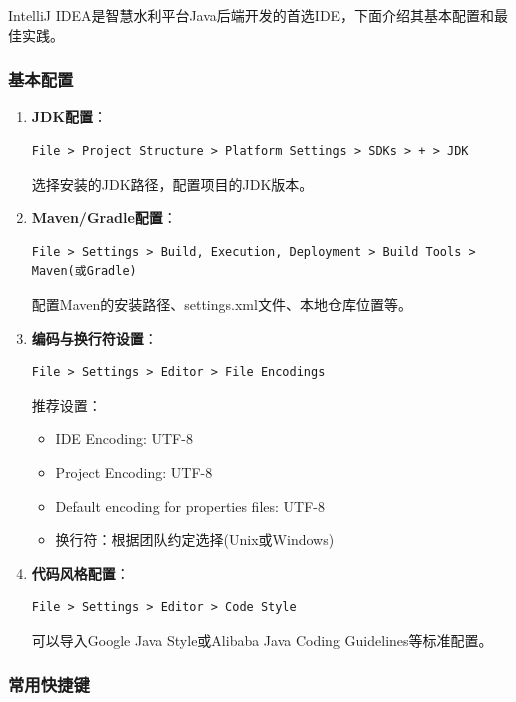 IntelliJ
IDEA是智慧水利平台Java后端开发的首选IDE，下面介绍其基本配置和最佳实践。

\subsubsection{基本配置}\label{ux57faux672cux914dux7f6e}

\begin{enumerate}
\def\labelenumi{\arabic{enumi}.}
\item
  \textbf{JDK配置}：

\begin{lstlisting}
File > Project Structure > Platform Settings > SDKs > + > JDK
\end{lstlisting}

  选择安装的JDK路径，配置项目的JDK版本。
\item
  \textbf{Maven/Gradle配置}：

\begin{lstlisting}
File > Settings > Build, Execution, Deployment > Build Tools > Maven(或Gradle)
\end{lstlisting}

  配置Maven的安装路径、settings.xml文件、本地仓库位置等。
\item
  \textbf{编码与换行符设置}：

\begin{lstlisting}
File > Settings > Editor > File Encodings
\end{lstlisting}

  推荐设置：

  \begin{itemize}
  \tightlist
  \item
    IDE Encoding: UTF-8
  \item
    Project Encoding: UTF-8
  \item
    Default encoding for properties files: UTF-8
  \item
    换行符：根据团队约定选择(Unix或Windows)
  \end{itemize}
\item
  \textbf{代码风格配置}：

\begin{lstlisting}
File > Settings > Editor > Code Style
\end{lstlisting}

  可以导入Google Java Style或Alibaba Java Coding Guidelines等标准配置。
\end{enumerate}

\subsubsection{常用快捷键}\label{ux5e38ux7528ux5febux6377ux952e}


